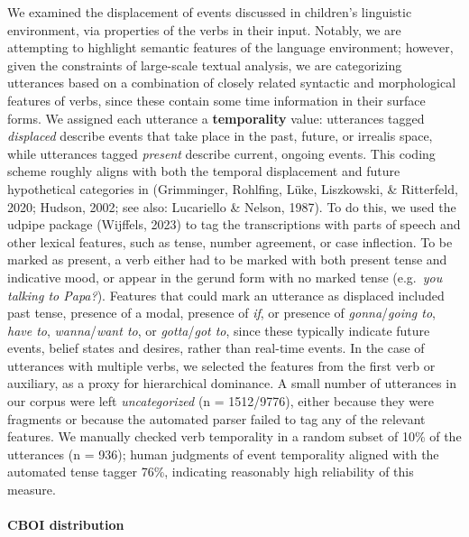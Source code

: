 \documentclass[
  man]{apa6}
\let\oldparagraph\paragraph
\renewcommand{\paragraph}[1]{\oldparagraph{#1}\mbox{}}
\begin{document}
We examined the displacement of events discussed in children's linguistic environment, via properties of the verbs in their input. Notably, we are attempting to highlight semantic features of the language environment; however, given the constraints of large-scale textual analysis, we are categorizing utterances based on a combination of closely related syntactic and morphological features of verbs, since these contain some time information in their surface forms. We assigned each utterance a \textbf{temporality} value: utterances tagged \emph{displaced} describe events that take place in the past, future, or irrealis space, while utterances tagged \emph{present} describe current, ongoing events. This coding scheme roughly aligns with both the temporal displacement and future hypothetical categories in (Grimminger, Rohlfing, Lüke, Liszkowski, \& Ritterfeld, 2020; Hudson, 2002; see also: Lucariello \& Nelson, 1987). To do this, we used the udpipe package (Wijffels, 2023) to tag the transcriptions with parts of speech and other lexical features, such as tense, number agreement, or case inflection. To be marked as present, a verb either had to be marked with both present tense and indicative mood, or appear in the gerund form with no marked tense (e.g.~\emph{you talking to Papa?}). Features that could mark an utterance as displaced included past tense, presence of a modal, presence of \emph{if}, or presence of \emph{gonna}/\emph{going to}, \emph{have to}, \emph{wanna}/\emph{want to}, or \emph{gotta}/\emph{got to}, since these typically indicate future events, belief states and desires, rather than real-time events. In the case of utterances with multiple verbs, we selected the features from the first verb or auxiliary, as a proxy for hierarchical dominance. A small number of utterances in our corpus were left \emph{uncategorized} (n = 1512/9776), either because they were fragments or because the automated parser failed to tag any of the relevant features. We manually checked verb temporality in a random subset of 10\% of the utterances (n = 936); human judgments of event temporality aligned with the automated tense tagger 76\%, indicating reasonably high reliability of this measure.

\hypertarget{cboi-distribution}{%
\paragraph{CBOI distribution}\label{cboi-distribution}}
\end{document}
